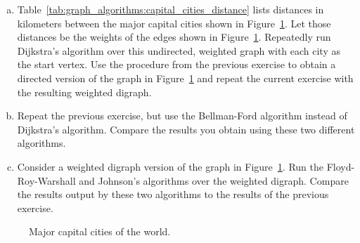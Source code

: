 \begin{problem}
\begin{enumerate}[(a)]
  \item Table~\ref{tab:graph_algorithms:capital_cities_distance} lists
    distances in kilometers between the major capital cities shown in
    Figure~\ref{fig:graph_algorithms:worldmap_capital_cities}. Let
    those distances be the weights of the edges shown in
    Figure~\ref{fig:graph_algorithms:worldmap_capital_cities}. Repeatedly
    run Dijkstra's algorithm over this
    undirected, weighted graph with each city as the start vertex. Use
    the procedure from the previous exercise to obtain a directed
    version of the graph in
    Figure~\ref{fig:graph_algorithms:worldmap_capital_cities} and
    repeat the current exercise with the resulting weighted digraph.

  \item Repeat the previous exercise, but use the
    Bellman-Ford algorithm instead of
    Dijkstra's algorithm. Compare the
    results you obtain using these two different algorithms.

  \item Consider a weighted digraph version of the graph in
    Figure~\ref{fig:graph_algorithms:worldmap_capital_cities}. Run the
    Floyd-Roy-Warshall and
    Johnson's algorithms over the weighted
    digraph. Compare the results output by these two algorithms to the
    results of the previous exercise.
  \end{enumerate}

\begin{landscape}
\begin{figure}[!htbp]
\centering
{}

\caption{Major capital cities of the world.}
\label{fig:graph_algorithms:worldmap_capital_cities}
\end{figure}
\end{landscape}


\end{problem}

